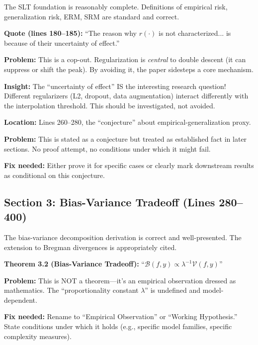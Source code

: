 \documentclass[11pt]{article}
\begin{document}
\begin{insightbox}[Strength]
The SLT foundation is reasonably complete. Definitions of empirical risk, generalization risk, ERM, SRM are standard and correct.
\end{insightbox}

\begin{vuongmacbox}
\textbf{Quote (lines 180--185):} ``The reason why $r(\cdot)$ is not characterized... is because of their uncertainty of effect.''

\textbf{Problem:} This is a cop-out. Regularization is \emph{central} to double descent (it can suppress or shift the peak). By avoiding it, the paper sidesteps a core mechanism.

\textbf{Insight:} The ``uncertainty of effect'' IS the interesting research question! Different regularizers (L2, dropout, data augmentation) interact differently with the interpolation threshold. This should be investigated, not avoided.
\end{vuongmacbox}

\begin{handwavebox}
\textbf{Location:} Lines 260--280, the ``conjecture'' about empirical-generalization proxy.

\textbf{Problem:} This is stated as a conjecture but treated as established fact in later sections. No proof attempt, no conditions under which it might fail.

\textbf{Fix needed:} Either prove it for specific cases or clearly mark downstream results as conditional on this conjecture.
\end{handwavebox}

\subsection{Section 3: Bias-Variance Tradeoff (Lines 280--400)}

\begin{insightbox}
The bias-variance decomposition derivation is correct and well-presented. The extension to Bregman divergences is appropriately cited.
\end{insightbox}

\begin{vuongmacbox}
\textbf{Theorem 3.2 (Bias-Variance Tradeoff):} ``$\mathcal{B}(f,y) \propto \lambda^{-1} \mathcal{V}(f,y)$''

\textbf{Problem:} This is NOT a theorem---it's an empirical observation dressed as mathematics. The ``proportionality constant $\lambda$'' is undefined and model-dependent.

\textbf{Fix needed:} Rename to ``Empirical Observation'' or ``Working Hypothesis.'' State conditions under which it holds (e.g., specific model families, specific complexity measures).
\end{vuongmacbox}
\end{document}
